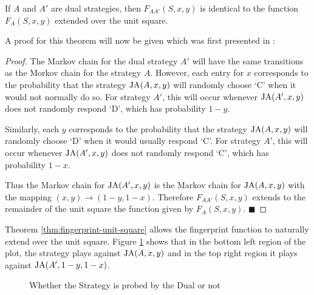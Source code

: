 \begin{theorem}\label{thm:fingerprint-unit-square}
If $A$ and $A'$ are dual strategies, then $F_{AA'}(S, x, y)$ is identical to the function $F_A(S, x, y)$ extended over the unit square.
\end{theorem}

A proof for this theorem will now be given which was first presented in \cite{Ashlock2004}:
\begin{proof}\label{prf:fingerprint-unit-square}
The Markov chain for the dual strategy $A'$ will have the same transitions as the Morkov chain for the strategy $A$.
However, each entry for $x$ corresponds to the probability that the strategy $\text{JA}(A, x, y)$ will randomly choose `C' when it would not normally do so.
For strategy $A'$, this will occur whenever $\text{JA}(A', x, y)$ does not randomly respond `D', which has probability $1 - y$.

Similarly, each $y$ corresponds to the probability that the strategy $\text{JA}(A, x, y)$ will randomly choose `D' when it would usually respond `C'.
For strategy $A'$, this will occur whenever $\text{JA}(A', x, y)$ does not randomly respond `C', which has probability $1 - x$.

Thus the Markov chain for $\text{JA}(A', x, y)$ is the Markov chain for $\text{JA}(A, x, y)$ with the mapping $(x, y) \rightarrow (1-y, 1-x)$.
Therefore $F_{AA'}(S, x, y)$ extends to the remainder of the unit square the function given by $F_A(S, x, y)$. $\blacksquare$
\end{proof}

Theorem \ref{thm:fingerprint-unit-square} allows the fingerprint function to naturally extend over the unit square.
Figure \ref{fig:DualProbe} shows that in the \textcolor{sol-violet}{bottom left} region of the plot, the strategy plays against $\text{JA}(A, x, y)$ and in the \textcolor{sol-cyan}{top right} region it plays against $\text{JA}(A', 1-y, 1-x)$.

\begin{figure}[!hbtp]
    \begin{center}
        
        \caption{Whether the Strategy is probed by the Dual or not}\label{fig:DualProbe}
    \end{center}
\end{figure}




\solarizedPalette



